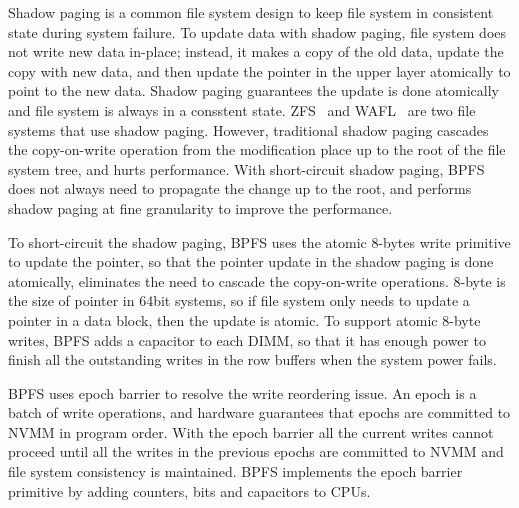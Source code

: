Shadow paging is a common file system design to keep file system in consistent
state during system failure. To update data with shadow paging, file system
does not write new data in-place; instead, it makes a copy of the old data,
update the copy with new data, and then update the pointer in the upper layer
atomically to point to the new data. Shadow paging guarantees the update is done
atomically and file system is always in a consstent state.
 ZFS~\cite{zfs} and WAFL~\cite{wafl} are two file
systems that use shadow paging. However, traditional shadow paging cascades
the copy-on-write operation from the modification place up to the root of 
the file system tree, and hurts performance. With short-circuit shadow paging,
BPFS does not always need to propagate the change up to the root, and performs
shadow paging at fine granularity to improve the performance.

To short-circuit the shadow paging, BPFS uses the atomic 8-bytes write primitive
to update the pointer, so that the pointer update in the shadow paging is done
atomically, eliminates the need to cascade the copy-on-write operations.
8-byte is the size of pointer in 64bit systems, so if file system only needs to
update a pointer in a data block, then the update is atomic. To support
atomic 8-byte writes, BPFS adds a capacitor to each DIMM, so that it has enough
power to finish all the outstanding writes in the row buffers when the system
power fails.

 BPFS uses
epoch barrier to resolve the write reordering issue. 
An epoch is a batch of write operations,
and hardware guarantees that epochs are committed to NVMM in program order.
With the epoch barrier all the current writes cannot proceed until all the
writes in the previous epochs are committed to NVMM and file system consistency
is maintained. BPFS implements the epoch barrier primitive by adding counters,
bits and capacitors to CPUs.

